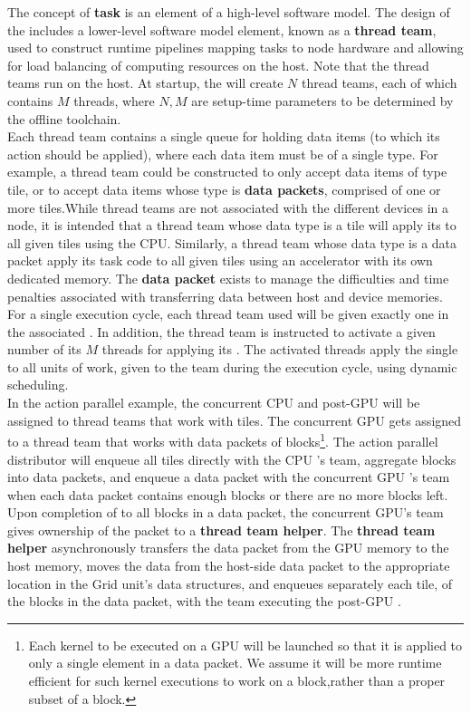 \documentclass{article}
\begin{document}
The concept of \textbf{task} is an element of a high-level software model.  The design of
the \OR includes a lower-level software model element, known as a
\textbf{thread team}, used to construct runtime
pipelines mapping tasks to node hardware and allowing for load
balancing of computing resources on the host. Note that the thread teams run on the host.
At startup, the \OR will create $N$ thread teams, each of which contains $M$
threads, where $N, M$ are setup-time parameters to be determined by the offline
toolchain.\\

Each thread team contains a single queue for holding data items (to which its
action should be applied), where each data item must be of a single type.  For
example, a thread team could be constructed to only accept data items of type
tile, or to accept data items whose
type is \textbf{data packets}, comprised
of one or more tiles.While thread teams are not associated with the
different devices in a node, it is intended that a thread team whose data type
is a tile will apply its \actionroutine to all given tiles
using the CPU.  Similarly, a thread team whose data type is a data packet
 apply its task code to all given tiles using an
accelerator with its own dedicated memory. The \textbf{data packet}
exists to manage the difficulties and time penalties associated with
transferring data between host and device memories.\\

For a single \OR execution cycle, each thread team used
will be given exactly one \actionroutine in the associated \actionroutinebundle.  In addition, the thread team
is instructed to activate a given number of its $M$ threads for applying its
\actionroutine.  The activated threads apply the single \actionroutine to all units of
work, given to the team during the execution cycle, using dynamic scheduling.\\

In the action parallel example, the concurrent CPU and post-GPU
\actionroutines will be assigned to thread teams that work with tiles. The
concurrent GPU \actionroutine gets assigned to a thread team that works with data packets of
blocks\footnote{Each kernel to be executed on a GPU will be launched so that it
is applied to only a single element in a data packet.  We assume
it will be more runtime efficient for such kernel executions to
work on a block,rather than a proper subset of a block.}.  The action parallel
distributor will enqueue all tiles directly with the CPU \actionroutine's team,
aggregate blocks into data packets, and enqueue a data packet with the
concurrent GPU \actionroutine's team when each data packet contains enough
blocks or there are no more blocks left.  Upon completion of \actionroutine to
all blocks in a data packet, the concurrent GPU's team gives
ownership of the packet to a \textbf{thread team helper}.
The \textbf{thread team helper} asynchronously
transfers the data packet from the GPU memory to the host memory, moves the data
from the host-side data packet to the appropriate location in the Grid unit's
data structures, and enqueues separately each tile, of the blocks in the data
packet, with the team executing the post-GPU \actionroutine.\\
\end{document}
